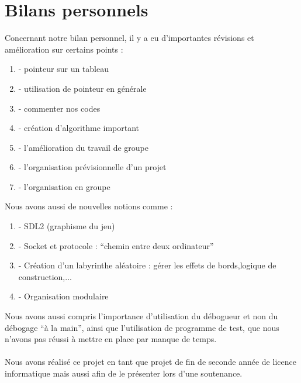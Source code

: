 \documentclass[12pt,a4paper,twoside]{article}
\begin{document}
\section{Bilans personnels}
Concernant notre bilan personnel, il y a eu d’importantes révisions et amélioration sur certains points : 
\begin{enumerate}
\item- pointeur sur un tableau
\item- utilisation de pointeur en générale
\item- commenter nos codes
\item- création d’algorithme important
\item- l’amélioration du travail de groupe
\item- l’organisation prévisionnelle d’un projet
\item- l’organisation en groupe 
\end{enumerate}
Nous avons aussi de nouvelles notions comme : 
\begin{enumerate}
\item- SDL2  (graphisme du jeu)
\item- Socket et protocole : “chemin entre deux ordinateur”
\item- Création d’un labyrinthe aléatoire : gérer les effets de bords,logique de construction,...
\item- Organisation modulaire
\end{enumerate}
Nous avons aussi compris l’importance d’utilisation du débogueur et non du débogage “à la main”, ainsi que l’utilisation de programme de test, que nous n’avons pas réussi à mettre en place par manque de temps.
\\
\\
Nous avons réalisé ce projet en tant que projet de fin de seconde année de licence informatique mais aussi afin de le présenter lors d'une soutenance.
\end{document}
